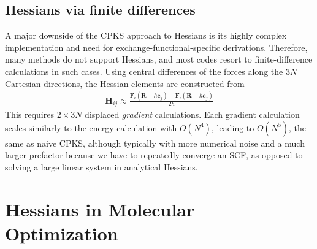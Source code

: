 \documentclass[pdflatex,sn-mathphys-num]{sn-jnl}%
\begin{document}
\subsection{Hessians via finite differences}
\label{sec:finite_difference}
A major downside of the CPKS approach to Hessians is its highly complex implementation and need for exchange-functional-specific derivations. Therefore, many methods do not support Hessians, and most codes resort to finite-difference calculations in such cases. Using central differences of the forces along the $3N$ Cartesian directions, the Hessian elements are constructed from
\begin{align}
    \mathbf{H}_{ij} \approx \frac{\mathbf{F}_i(\mathbf{R} + h \mathbf{e}_j) - \mathbf{F}_i(\mathbf{R} - h \mathbf{e}_j)}{2h}
\end{align}
This requires $2\times 3N$ displaced \emph{gradient} calculations. Each gradient calculation scales similarly to the energy calculation with $O(N^4)$, leading to $O(N^5)$, the same as naive CPKS, although typically with more numerical noise and a much larger prefactor because we have to repeatedly converge an SCF, as opposed to solving a large linear system in analytical Hessians.

\section{Hessians in Molecular Optimization}
\end{document}
